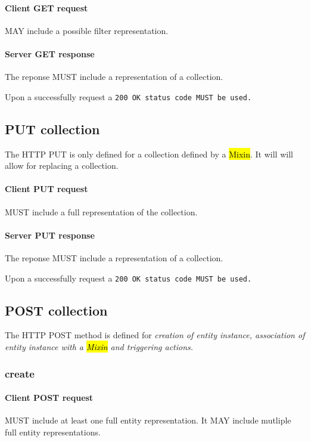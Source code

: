 \documentclass[10pt,a4paper]{article}
\begin{document}
\paragraph{Client GET request}
MAY include a possible filter representation.

\paragraph{Server GET response}
The reponse MUST include a representation of a collection.

Upon a successfully request a \tt{200 OK} status code MUST be used.

\subsection{PUT collection}
The HTTP PUT is only defined for a collection defined by a \hl{Mixin}. It will will allow for replacing a collection.

\paragraph{Client PUT request}
MUST include a full representation of the collection.

\paragraph{Server PUT response}
The reponse MUST include a representation of a collection.

Upon a successfully request a \tt{200 OK} status code MUST be used.

\subsection{POST collection}
The HTTP POST method is defined for \em{creation} of entity instance, \em{association} of entity instance with a \hl{Mixin} and triggering \em{actions}.

\subsubsection{create}

\paragraph{Client POST request}
MUST include at least one full entity representation. It MAY include mutliple full entity representations.
\end{document}
